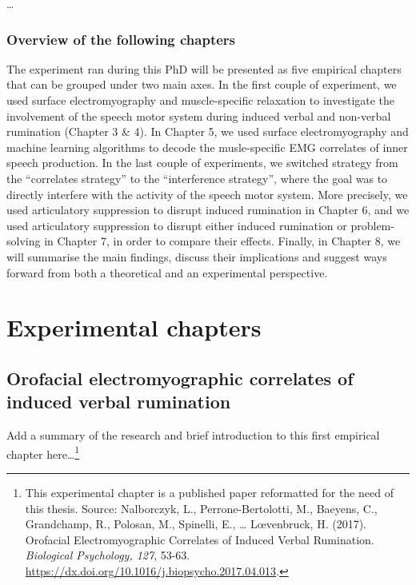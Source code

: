 \documentclass[a4paper,12pt,twoside,openright,oldfontcommands]{memoir}
\let\rmarkdownfootnote\footnote%
\def\footnote{\protect\rmarkdownfootnote}
\begin{document}
\ldots{}

\section{Overview of the following
chapters}\label{overview-of-the-following-chapters}

The experiment ran during this PhD will be presented as five empirical
chapters that can be grouped under two main axes. In the first couple of
experiment, we used surface electromyography and muscle-specific
relaxation to investigate the involvement of the speech motor system
during induced verbal and non-verbal rumination (Chapter 3 \& 4). In
Chapter 5, we used surface electromyography and machine learning
algorithms to decode the musle-specific EMG correlates of inner speech
production. In the last couple of experiments, we switched strategy from
the ``correlates strategy'' to the ``interference strategy'', where the
goal was to directly interfere with the activity of the speech motor
system. More precisely, we used articulatory suppression to disrupt
induced rumination in Chapter 6, and we used articulatory suppression to
disrupt either induced rumination or problem-solving in Chapter 7, in
order to compare their effects. Finally, in Chapter 8, we will summarise
the main findings, discuss their implications and suggest ways forward
from both a theoretical and an experimental perspective.

\part{Experimental
chapters}\label{part-experimental-chapters}

\chapter{Orofacial electromyographic correlates of induced verbal
rumination}\label{orofacial-electromyographic-correlates-of-induced-verbal-rumination}

Add a summary of the research and brief introduction to this first
empirical chapter here\ldots{}\footnote{This experimental chapter is a
  published paper reformatted for the need of this thesis. Source:
  Nalborczyk, L., Perrone-Bertolotti, M., Baeyens, C., Grandchamp, R.,
  Polosan, M., Spinelli, E., \ldots{} L\oe venbruck, H. (2017).
  Orofacial Electromyographic Correlates of Induced Verbal Rumination.
  \emph{Biological Psychology, 127}, 53-63.
  \url{https://dx.doi.org/10.1016/j.biopsycho.2017.04.013}.}
\end{document}
